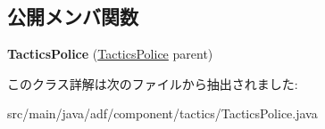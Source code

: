 \subsection*{公開メンバ関数}
\begin{DoxyCompactItemize}
\item 
\hypertarget{classadf_1_1component_1_1tactics_1_1TacticsPolice_a2064eb132cdc6da417b520bae9c63df3}{}\label{classadf_1_1component_1_1tactics_1_1TacticsPolice_a2064eb132cdc6da417b520bae9c63df3} 
{\bfseries Tactics\+Police} (\hyperlink{classadf_1_1component_1_1tactics_1_1TacticsPolice}{Tactics\+Police} parent)
\end{DoxyCompactItemize}


このクラス詳解は次のファイルから抽出されました\+:\begin{DoxyCompactItemize}
\item 
src/main/java/adf/component/tactics/Tactics\+Police.\+java\end{DoxyCompactItemize}
